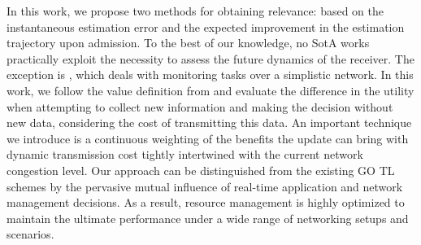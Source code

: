 In this work, we propose two methods for obtaining relevance: based on the instantaneous estimation error and the expected improvement in the estimation trajectory upon admission. To the best of our knowledge, no SotA works practically exploit the necessity to assess the future dynamics of the receiver. The exception is \cite{holm2023goal}, which deals with monitoring tasks over a simplistic network. In this work, we follow the value definition from \cite{alawad2022value} and evaluate the difference in the utility when attempting to collect new information and making the decision without new data, considering the cost of transmitting this data. An important technique we introduce is a continuous weighting of the benefits the update can bring with dynamic transmission cost tightly intertwined with the current network congestion level. Our approach can be distinguished from the existing GO TL schemes by the pervasive mutual influence of real-time application and network management decisions. As a result,  resource management is highly optimized to maintain the ultimate performance under a wide range of networking setups and scenarios.